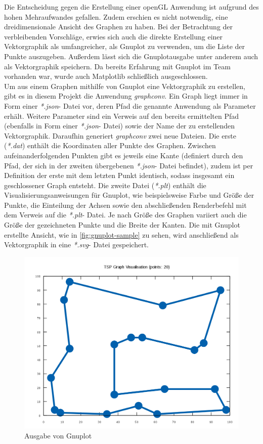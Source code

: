 \documentclass[12pt,a4paper]{scrreprt}
\begin{document}
Die Entscheidung gegen die Erstellung einer openGL Anwendung ist aufgrund des hohen Mehraufwandes gefallen. Zudem erschien es nicht notwendig, eine dreidimensionale Ansicht des Graphen zu haben. Bei der Betrachtung der verbleibenden Vorschläge, erwies sich auch die direkte Erstellung einer Vektorgraphik als umfangreicher, als Gnuplot zu verwenden, um die Liste der Punkte auszugeben. Außerdem lässt sich die Gnuplotausgabe unter anderem auch als Vektorgraphik speichern. Da bereits Erfahrung mit Gnuplot im Team vorhanden war, wurde auch Matplotlib schließlich ausgeschlossen.\\
Um aus einem Graphen mithilfe von Gnuplot eine Vektorgraphik zu erstellen, gibt es in diesem Projekt die Anwendung \textit{graphconv}. Ein Graph liegt immer in Form einer \textit{*.json}- Datei vor, deren Pfad die genannte Anwendung als Parameter erhält. Weitere Parameter sind ein Verweis auf den bereits ermittelten Pfad (ebenfalls in Form einer \textit{*.json}- Datei) sowie der Name der zu erstellenden Vektorgraphik. Daraufhin generiert \textit{graphconv} zwei neue Dateien. Die erste (\textit{*.dat}) enthält die Koordinaten aller Punkte des Graphen. Zwischen aufeinanderfolgenden Punkten gibt es jeweils eine Kante (definiert durch den Pfad, der sich in der zweiten übergebenen \textit{*.json}- Datei befindet), zudem ist per Definition der erste mit dem letzten Punkt identisch, sodass insgesamt ein geschlossener Graph entsteht. Die zweite Datei (\textit{*.plt}) enthält die Visualisierungsanweisungen für Gnuplot, wie beispielsweise Farbe und Größe der Punkte, die Einteilung der Achsen sowie den abschließenden Renderbefehl mit dem Verweis auf die \textit{*.plt}- Datei. Je nach Größe des Graphen variiert auch die Größe der gezeichneten Punkte und die Breite der Kanten. Die mit Gnuplot erstellte Ansicht, wie in \autoref{fig:gnuplot-sample} zu sehen, wird anschließend als Vektorgraphik in eine \textit{*.svg}- Datei gespeichert.
\pagebreak

\begin{figure}[ht]
  	\centering
	\includegraphics[width=400pt]{images/gnuplot_sample.png}
	\caption{Ausgabe von Gnuplot}
	\label{fig:gnuplot-sample}
\end{figure}
\end{document}
